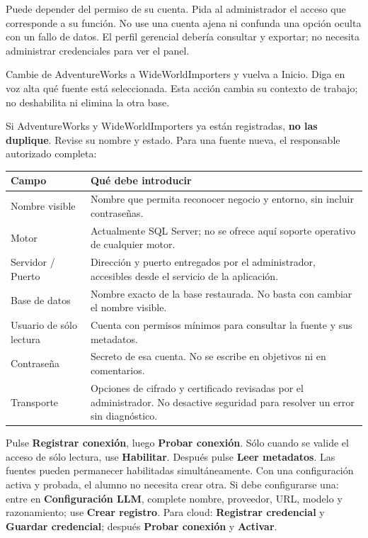 \begin{note}
Puede depender del permiso de su cuenta. Pida al administrador el acceso que corresponde a su función. No use una cuenta ajena ni confunda una opción oculta con un fallo de datos. El perfil gerencial debería consultar y exportar; no necesita administrar credenciales para ver el panel.
\end{note}
Cambie de AdventureWorks a WideWorldImporters y vuelva a Inicio. Diga en voz alta qué fuente está seleccionada. Esta acción cambia su contexto de trabajo; no deshabilita ni elimina la otra base.

Si AdventureWorks y WideWorldImporters ya están registradas, \textbf{no las duplique}. Revise su nombre y estado. Para una fuente nueva, el responsable autorizado completa:
\begin{tabularx}{\linewidth}{@{}p{43mm}Y@{}}
\toprule
\textbf{Campo}&\textbf{Qué debe introducir}\\
\midrule
Nombre visible&Nombre que permita reconocer negocio y entorno, sin incluir contraseñas.\\
Motor&Actualmente SQL Server; no se ofrece aquí soporte operativo de cualquier motor.\\
Servidor / Puerto&Dirección y puerto entregados por el administrador, accesibles desde el servicio de la aplicación.\\
Base de datos&Nombre exacto de la base restaurada. No basta con cambiar el nombre visible.\\
Usuario de sólo lectura&Cuenta con permisos mínimos para consultar la fuente y sus metadatos.\\
Contraseña&Secreto de esa cuenta. No se escribe en objetivos ni en comentarios.\\
Transporte&Opciones de cifrado y certificado revisadas por el administrador. No desactive seguridad para resolver un error sin diagnóstico.\\
\bottomrule
\end{tabularx}
Pulse \textbf{Registrar conexión}, luego \textbf{Probar conexión}. Sólo cuando se valide el acceso de sólo lectura, use \textbf{Habilitar}. Después pulse \textbf{Leer metadatos}. Las fuentes pueden permanecer habilitadas simultáneamente.
Con una configuración activa y probada, el alumno no necesita crear otra. Si debe configurarse una: entre en \textbf{Configuración LLM}, complete nombre, proveedor, URL, modelo y razonamiento; use \textbf{Crear registro}. Para cloud: \textbf{Registrar credencial} y \textbf{Guardar credencial}; después \textbf{Probar conexión} y \textbf{Activar}.

